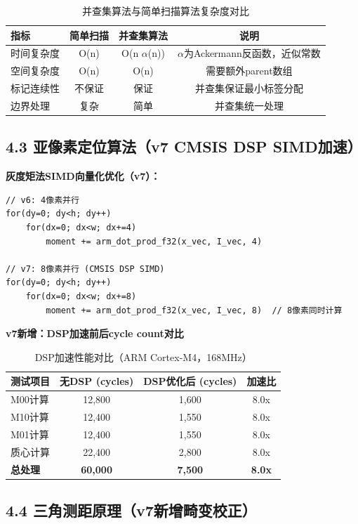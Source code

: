 \documentclass[12pt,a4paper]{article}
\begin{document}
\begin{table}[H]
\centering
\caption{并查集算法与简单扫描算法复杂度对比}
\begin{tabular}{lccc}
\toprule
指标 & 简单扫描 & 并查集算法 & 说明 \\
\midrule
时间复杂度 & O(n) & O(n $\alpha$(n)) & $\alpha$为Ackermann反函数，近似常数 \\
空间复杂度 & O(n) & O(n) & 需要额外parent数组 \\
标记连续性 & 不保证 & 保证 & 并查集保证最小标签分配 \\
边界处理 & 复杂 & 简单 & 并查集统一处理 \\
\bottomrule
\end{tabular}
\end{table}

\subsection{4.3 亚像素定位算法（v7 CMSIS DSP SIMD加速）}

\textbf{灰度矩法SIMD向量化优化（v7）：}

\begin{verbatim}
// v6: 4像素并行
for(dy=0; dy<h; dy++)
    for(dx=0; dx<w; dx+=4)
        moment += arm_dot_prod_f32(x_vec, I_vec, 4)

// v7: 8像素并行 (CMSIS DSP SIMD)
for(dy=0; dy<h; dy++)
    for(dx=0; dx<w; dx+=8)
        moment += arm_dot_prod_f32(x_vec, I_vec, 8)  // 8像素同时计算
\end{verbatim}

\textbf{v7新增：DSP加速前后cycle count对比}

\begin{table}[H]
\centering
\caption{DSP加速性能对比（ARM Cortex-M4，168MHz）}
\begin{tabular}{lccc}
\toprule
测试项目 & 无DSP (cycles) & DSP优化后 (cycles) & 加速比 \\
\midrule
M00计算 & 12,800 & 1,600 & 8.0x \\
M10计算 & 12,400 & 1,550 & 8.0x \\
M01计算 & 12,400 & 1,550 & 8.0x \\
质心计算 & 22,400 & 2,800 & 8.0x \\
\textbf{总处理} & \textbf{60,000} & \textbf{7,500} & \textbf{8.0x} \\
\bottomrule
\end{tabular}
\end{table}

\subsection{4.4 三角测距原理（v7新增畸变校正）}
\end{document}
